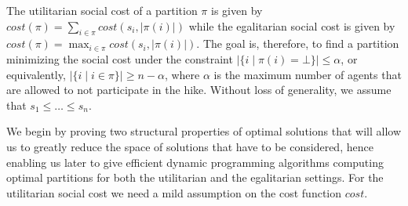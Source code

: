 \documentclass[a4paper]{article}
\newcommand{\set}[1]{\{#1\}}
\newcommand{\modulus}[1]{\vert #1 \vert}
\newcommand{\cost}{\mathit{cost}}
\begin{document}
The utilitarian social cost of a partition $\pi$ is given by $\cost(\pi) = \sum_{i\in\pi}\cost(s_i,\modulus{\pi(i)})$ while the egalitarian social cost is given by $\cost(\pi) = \max_{i\in \pi}\cost(s_i,\modulus{\pi(i)})$. The goal is, therefore, to find a partition minimizing the social cost under the constraint $\modulus{\set{i \mid \pi(i)=\bot}} \leq \alpha$, or equivalently, $\modulus{\set{i \mid i\in\pi}} \geq n-\alpha$, where $\alpha$ is the maximum number of agents that are allowed to not participate in the hike. Without loss of generality, we assume that $s_1 \leq \ldots \leq s_n.$

We begin by proving two structural properties of optimal solutions that will allow us to greatly reduce the space of solutions that have to be considered, hence enabling us later to give efficient dynamic programming algorithms computing optimal partitions for both the utilitarian and the egalitarian settings. For the utilitarian social cost we need a mild assumption on the cost function $\cost$.
\end{document}
